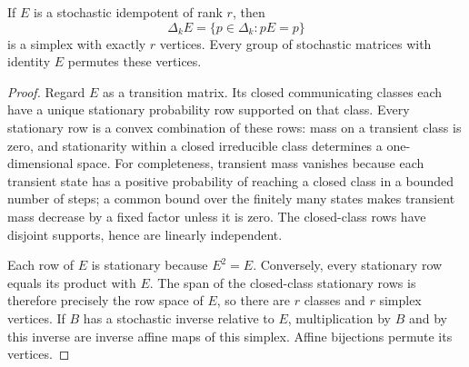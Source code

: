 \begin{lemma}\label{lem:simplex55}
If $E$ is a stochastic idempotent of rank $r$, then
\[
 \Delta_k E=\{p\in\Delta_k:pE=p\}
\]
is a simplex with exactly $r$ vertices. Every group of stochastic matrices with identity $E$ permutes these vertices.
\end{lemma}
\begin{proof}
Regard $E$ as a transition matrix. Its closed communicating classes each have a unique stationary probability row supported on that class. Every stationary row is a convex combination of these rows: mass on a transient class is zero, and stationarity within a closed irreducible class determines a one-dimensional space. For completeness, transient mass vanishes because each transient state has a positive probability of reaching a closed class in a bounded number of steps; a common bound over the finitely many states makes transient mass decrease by a fixed factor unless it is zero. The closed-class rows have disjoint supports, hence are linearly independent.

Each row of $E$ is stationary because $E^2=E$. Conversely, every stationary row equals its product with $E$. The span of the closed-class stationary rows is therefore precisely the row space of $E$, so there are $r$ classes and $r$ simplex vertices. If $B$ has a stochastic inverse relative to $E$, multiplication by $B$ and by this inverse are inverse affine maps of this simplex. Affine bijections permute its vertices.
\end{proof}

